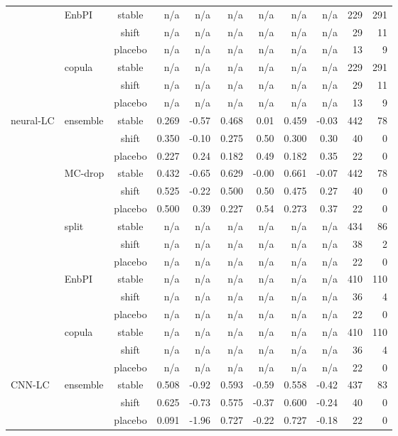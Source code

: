 {\begin{longtable}{@{}llcrrrrrrrr@{}}
 & EnbPI & stable & n/a & n/a & n/a & n/a & n/a & n/a & 229 & 291 \\
 &  & shift & n/a & n/a & n/a & n/a & n/a & n/a & 29 & 11 \\
 &  & placebo & n/a & n/a & n/a & n/a & n/a & n/a & 13 & 9 \\
 & copula & stable & n/a & n/a & n/a & n/a & n/a & n/a & 229 & 291 \\
 &  & shift & n/a & n/a & n/a & n/a & n/a & n/a & 29 & 11 \\
 &  & placebo & n/a & n/a & n/a & n/a & n/a & n/a & 13 & 9 \\
\addlinespace[2pt]
neural-LC & ensemble & stable & 0.269 & -0.57 & 0.468 & 0.01 & 0.459 & -0.03 & 442 & 78 \\
 &  & shift & 0.350 & -0.10 & 0.275 & 0.50 & 0.300 & 0.30 & 40 & 0 \\
 &  & placebo & 0.227 & 0.24 & 0.182 & 0.49 & 0.182 & 0.35 & 22 & 0 \\
 & MC-drop & stable & 0.432 & -0.65 & 0.629 & -0.00 & 0.661 & -0.07 & 442 & 78 \\
 &  & shift & 0.525 & -0.22 & 0.500 & 0.50 & 0.475 & 0.27 & 40 & 0 \\
 &  & placebo & 0.500 & 0.39 & 0.227 & 0.54 & 0.273 & 0.37 & 22 & 0 \\
 & split & stable & n/a & n/a & n/a & n/a & n/a & n/a & 434 & 86 \\
 &  & shift & n/a & n/a & n/a & n/a & n/a & n/a & 38 & 2 \\
 &  & placebo & n/a & n/a & n/a & n/a & n/a & n/a & 22 & 0 \\
 & EnbPI & stable & n/a & n/a & n/a & n/a & n/a & n/a & 410 & 110 \\
 &  & shift & n/a & n/a & n/a & n/a & n/a & n/a & 36 & 4 \\
 &  & placebo & n/a & n/a & n/a & n/a & n/a & n/a & 22 & 0 \\
 & copula & stable & n/a & n/a & n/a & n/a & n/a & n/a & 410 & 110 \\
 &  & shift & n/a & n/a & n/a & n/a & n/a & n/a & 36 & 4 \\
 &  & placebo & n/a & n/a & n/a & n/a & n/a & n/a & 22 & 0 \\
\addlinespace[2pt]
CNN-LC & ensemble & stable & 0.508 & -0.92 & 0.593 & -0.59 & 0.558 & -0.42 & 437 & 83 \\
 &  & shift & 0.625 & -0.73 & 0.575 & -0.37 & 0.600 & -0.24 & 40 & 0 \\
 &  & placebo & 0.091 & -1.96 & 0.727 & -0.22 & 0.727 & -0.18 & 22 & 0 \\

\end{longtable}}

